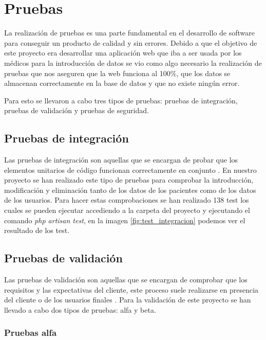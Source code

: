 \section{Pruebas}

La realización de pruebas es una parte fundamental en el desarrollo de software para conseguir un producto de calidad y sin errores. Debido a que el objetivo de este proyecto era desarrollar una aplicación web que iba a ser usada por los médicos para la introducción de datos se vio como algo necesario la realización de pruebas que nos aseguren que la web funciona al 100\%, que los datos se almacenan correctamente en la base de datos y que no existe ningún error.

Para esto se llevaron a cabo tres tipos de pruebas: pruebas de integración, pruebas de validación y pruebas de seguridad.

\subsection{Pruebas de integración}

Las pruebas de integración son aquellas que se encargan de probar que los elementos unitarios de código funcionan correctamente en conjunto \cite{pruebasIntegracion}. En nuestro proyecto se han realizado este tipo de pruebas para comprobar la introducción, modificación y eliminación tanto de los datos de los pacientes como de los datos de los usuarios. Para hacer estas comprobaciones se han realizado 138 test los cuales se pueden ejecutar accediendo a la carpeta del proyecto y ejecutando el comando \textit{php artisan test}, en la imagen \ref{fig:test_integracion} podemos ver el resultado de los test. 


\subsection{Pruebas de validación}

Las pruebas de validación son aquellas que se encargan de comprobar que los requisitos y las expectativas del cliente, este proceso suele realizarse en presencia del cliente o de los usuarios finales \cite{validacion}. Para la validación de este proyecto se han llevado a cabo dos tipos de pruebas: alfa y beta.

\subsubsection{Pruebas alfa}

